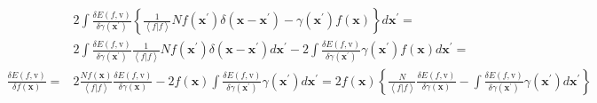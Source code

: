 \documentclass[aps,preprint]{revtex4}%
\begin{document}
\begin{align*}
&  2\int\frac{\delta E\left(  f\boldsymbol{,}\mathrm{v}\right)  }{\delta
\gamma\left(  \boldsymbol{x}^{\prime}\right)  }\left\{  \frac{1}{\left\langle
f|f\right\rangle }Nf\left(  \boldsymbol{x}^{\prime}\right)  \delta\left(
\boldsymbol{x-x}^{\prime}\right)  -\gamma\left(  \boldsymbol{x}^{\prime
}\right)  f\left(  \boldsymbol{x}\right)  \right\}  d\boldsymbol{x}^{\prime
}=\\
&  2\int\frac{\delta E\left(  f\boldsymbol{,}\mathrm{v}\right)  }{\delta
\gamma\left(  \boldsymbol{x}^{\prime}\right)  }\frac{1}{\left\langle
f|f\right\rangle }Nf\left(  \boldsymbol{x}^{\prime}\right)  \delta\left(
\boldsymbol{x-x}^{\prime}\right)  d\boldsymbol{x}^{\prime}-2\int\frac{\delta
E\left(  f\boldsymbol{,}\mathrm{v}\right)  }{\delta\gamma\left(
\boldsymbol{x}^{\prime}\right)  }\gamma\left(  \boldsymbol{x}^{\prime}\right)
f\left(  \boldsymbol{x}\right)  d\boldsymbol{x}^{\prime}=\\
\frac{\delta E\left(  f\boldsymbol{,}\mathrm{v}\right)  }{\delta f\left(
\boldsymbol{x}\right)  }=  &  2\frac{Nf\left(  \boldsymbol{x}\right)
}{\left\langle f|f\right\rangle }\frac{\delta E\left(  f\boldsymbol{,}%
\mathrm{v}\right)  }{\delta\gamma\left(  \boldsymbol{x}\right)  }-2f\left(
\boldsymbol{x}\right)  \int\frac{\delta E\left(  f\boldsymbol{,}%
\mathrm{v}\right)  }{\delta\gamma\left(  \boldsymbol{x}^{\prime}\right)
}\gamma\left(  \boldsymbol{x}^{\prime}\right)  d\boldsymbol{x}^{\prime
}=2f\left(  \boldsymbol{x}\right)  \left\{  \frac{N}{\left\langle
f|f\right\rangle }\frac{\delta E\left(  f\boldsymbol{,}\mathrm{v}\right)
}{\delta\gamma\left(  \boldsymbol{x}\right)  }-\int\frac{\delta E\left(
f\boldsymbol{,}\mathrm{v}\right)  }{\delta\gamma\left(  \boldsymbol{x}%
^{\prime}\right)  }\gamma\left(  \boldsymbol{x}^{\prime}\right)
d\boldsymbol{x}^{\prime}\right\}
\end{align*}



\end{document}
